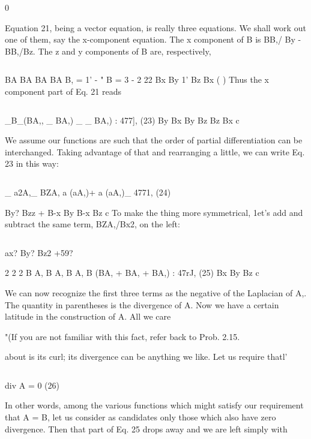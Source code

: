 0

Equation 21, being a vector equation, is really three equations.
We shall work out one of them, say the x-component equation. The
x component of \curl B is BB,/ By - BB,/Bz. The z and y components
of B are, respectively,

\begin{equation}
\end{equation}


BA BA BA BA
B, = 1' - " B = 3 - 2 22
Bx By 1' Bz Bx ( )
Thus the x component part of Eq. 21 reads

\begin{equation}
\end{equation}

_B_(BA,, _ BA,) _  _ BA,) : 477], (23)
By Bx By Bz Bz Bx c

We assume our functions are such that the order of partial differentiation
can be interchanged. Taking advantage of that and rearranging
a little, we can write Eq. 23 in this way:

\begin{equation}
\end{equation}

_ a2A,_ BZA, a (aA,)+ a (aA,)_ 4771, (24)

By? Bzz + B-x By B-x Bz c
To make the thing more symmetrical, 1et's add and subtract the same
term, BZA,/Bx2, on the left:

\begin{equation}
\end{equation}

ax? By? Bz2 +59?

2 2 2
B A, B A, B A, B (BA, + BA, + BA,) : 47rJ, (25)
Bx By Bz c

We can now recognize the first three terms as the negative of the
Laplacian of A,. The quantity in parentheses is the divergence of A.
Now we have a certain latitude in the construction of A. All we care

"(If you are not familiar with this fact, refer back to Prob. 2.15.

about is its curl; its divergence can be anything we like. Let us
require thatl'

\begin{equation}
\end{equation}

div A = 0 (26)

In other words, among the various functions which might satisfy our
requirement that \curl A = B, let us consider as candidates only those
which also have zero divergence. Then that part of Eq. 25 drops
away and we are left simply with

